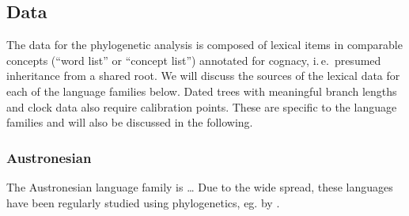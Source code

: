 \documentclass[a4paper,12pt]{scrartcl}
\begin{document}
\subsection{Data}
The data for the phylogenetic analysis is composed of lexical items in comparable concepts (“word list” or “concept list”) annotated
for cognacy, i.\,e.\ presumed inheritance from a shared root.
We will discuss the sources of the lexical data for each of the language families below.
Dated trees with meaningful branch lengths and clock data also require calibration points.
These are specific to the language families and will also be discussed in the following.

\subsubsection{Austronesian}

The Austronesian language family is …
Due to the wide spread, these languages have been regularly studied using phylogenetics, eg. by
\textcite{gray2009language,greenhill2017evolutionary,greenhill2018population}.
\end{document}
